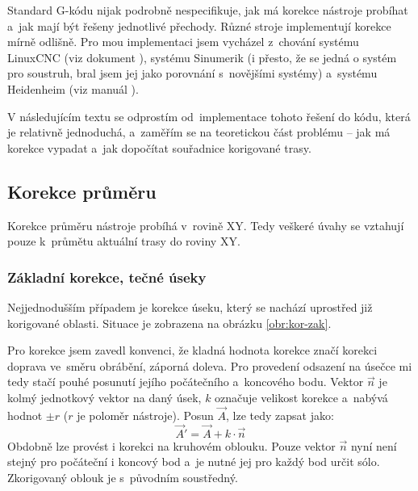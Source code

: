 		Standard G-kódu nijak podrobně nespecifikuje, jak má korekce nástroje probíhat a~jak mají být řešeny jednotlivé přechody. Různé stroje implementují korekce mírně odlišně. Pro mou implementaci jsem vycházel z~chování systému LinuxCNC (viz dokument \cite{emckor}), systému Sinumerik\cite{sinumerik} (i přesto, že se jedná o systém pro soustruh, bral jsem jej jako porovnání s~novějšími systémy) a~systému Heidenheim (viz manuál \cite{heid}).
		
		V následujícím textu se odprostím od~implementace tohoto řešení do kódu, která je relativně jednoduchá, a~zaměřím se na teoretickou část problému -- jak má korekce vypadat a~jak dopočítat souřadnice korigované trasy.
		
			\subsection{Korekce průměru}
			Korekce průměru nástroje probíhá v~rovině XY. Tedy veškeré úvahy se vztahují pouze k~průmětu aktuální trasy do roviny XY.
			
			\subsubsection{Základní korekce, tečné úseky}
			Nejjednodušším případem je korekce úseku, který se nachází uprostřed již korigované oblasti. Situace je zobrazena na obrázku \ref{obr:kor-zak}.
			
			Pro korekce jsem zavedl konvenci, že kladná hodnota korekce značí korekci doprava ve~směru obrábění, záporná doleva. Pro provedení odsazení na úsečce mi tedy stačí pouhé posunutí jejího počátečního a~koncového bodu. Vektor $\vec{n}$ je kolmý jednotkový vektor na daný úsek, $k$ označuje velikost korekce a~nabývá hodnot $\pm r$ ($r$ je poloměr nástroje). Posun $\vec{A}$, lze tedy zapsat jako:
			\begin{equation}
			\label{rov:odsz}
				\vec{A}' = \vec{A}+k\cdot\vec{n}
			\end{equation}
			Obdobně lze provést i korekci na kruhovém oblouku. Pouze vektor $\vec{n}$ nyní není stejný pro počáteční i koncový bod a~je nutné jej pro každý bod určit sólo. Zkorigovaný oblouk je s~původním soustředný.
			
